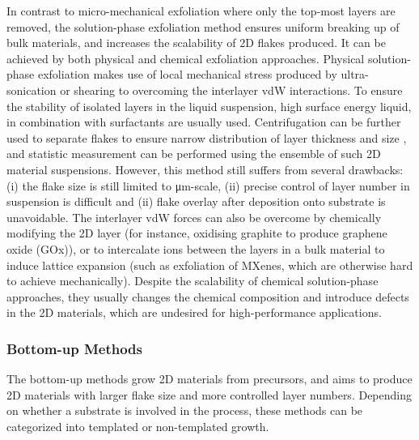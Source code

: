In contrast to micro-mechanical exfoliation where only the top-most
layers are removed, the solution-phase exfoliation method ensures
uniform breaking up of bulk materials, and increases the scalability
of 2D flakes produced. It can be achieved by both physical and
chemical exfoliation approaches. Physical solution-phase exfoliation
makes use of local mechanical stress produced by ultra-sonication or
shearing to overcoming the interlayer vdW interactions. To ensure the
stability of isolated layers in the liquid suspension, high surface
energy liquid, in combination with surfactants are usually
used. 
%
Centrifugation can be further used to separate flakes to ensure narrow
distribution of layer thickness and size , and
statistic measurement can be performed using the ensemble of such 2D
material suspensions.  However, this method still
suffers from several drawbacks: (i) the flake size is still limited to
μm-scale, (ii) precise control of layer number in suspension is difficult and 
(ii) flake overlay after deposition onto substrate is unavoidable.
%
The interlayer vdW forces can also be overcome by chemically modifying
the 2D layer (for instance, oxidising graphite to produce graphene
oxide (GOx)), or to intercalate ions between the layers in a bulk
material to induce lattice expansion (such as exfoliation of MXenes,
which are otherwise hard to achieve mechanically). Despite the
scalability of chemical solution-phase approaches, they usually
changes the chemical composition and introduce defects in the 2D
materials, which are undesired for high-performance
applications. 

\subsubsection{Bottom-up Methods}
\label{sec:bottom-up-methods}

The bottom-up methods grow 2D materials from precursors, and aims to
produce 2D materials with larger flake size and more controlled layer
numbers. Depending on whether a substrate is involved in the process,
these methods can be categorized into templated or non-templated
growth.

